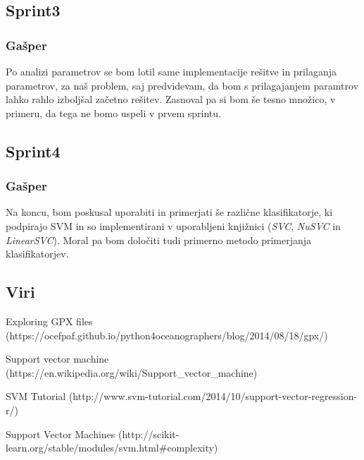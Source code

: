 \documentclass[a4paper,11pt]{article}
\begin{document}
\subsection{Sprint3}
\subsubsection{Gašper}
Po analizi parametrov se bom lotil same implementacije rešitve in prilaganja parametrov, za naš problem, saj predvidevam, da bom s prilagajanjem paramtrov lahko rahlo izboljšal začetno rešitev. Zasnoval pa si bom še tesno množico, v primeru, da tega ne bomo uspeli v prvem sprintu.

\subsection{Sprint4}
\subsubsection{Gašper}
Na koncu, bom poskusal uporabiti in primerjati še različne klasifikatorje, ki podpirajo SVM in so implementirani v uporabljeni knjižnici (\textit{SVC}, \textit{NuSVC} in \textit{LinearSVC}). Moral pa bom določiti tudi primerno metodo primerjanja klasifikatorjev.

\newpage
\subsection{Viri}
Exploring GPX files (https://ocefpaf.github.io/python4oceanographers/blog/2014/08/18/gpx/)

Support vector machine (https://en.wikipedia.org/wiki/Support_vector_machine)

SVM Tutorial (http://www.svm-tutorial.com/2014/10/support-vector-regression-r/)

Support Vector Machines (http://scikit-learn.org/stable/modules/svm.html\#complexity)
\end{document}
